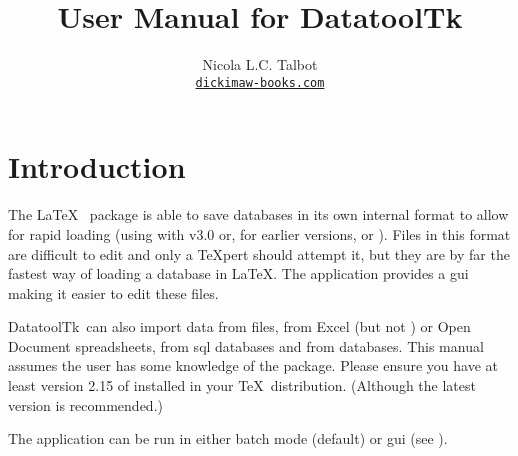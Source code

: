 
\usepackage{fontspec}
\setmainfont{Linux Libertine O}
\usepackage{verbatim}
\usepackage
 [
 ]{texjavahelp}

\hypersetup{colorlinks,linkcolor=blue}

\newcommand{\appname}{DatatoolTk}

\title{User Manual for \appname}
\author{Nicola L.C. Talbot\\\href{https://www.dickimaw-books.com/}{\nolinkurl{dickimaw-books.com}}}


\GlsXtrLoadResources[src={datatooltk},
 \TeXJavaHelpSymbolResourceOptions
]

\GlsXtrLoadResources[src={datatooltk,\langbibsrcs},
 \TeXJavaHelpGlsResourceOptions
]


\maketitle
\frontmatter
\tableofcontents
\listoffigures

\mainmatter
\chapter{Introduction}
\label{sec:introduction}

The \LaTeX\  package is able to save databases in its
own internal format to allow for rapid loading (using
 with
 v3.0 or, for earlier versions,
 or
).  Files in this
 format are difficult to edit and only a \TeX pert should
attempt it, but they are by far the fastest way of loading a
 \gls{database} in \LaTeX. The 
application provides a \gls{gui} making it easier to edit these
files. 

\appname\ can also import data from  files, from
Excel  (but not )
or Open Document  spreadsheets, from 
\gls{sql} databases and from  databases.
This manual assumes the user has some knowledge of the
 package. Please ensure you have at least version
2.15 of  installed in your \TeX\ distribution.
(Although the latest version is recommended.)

The  application can be run in either 
batch mode (default) or \gls{gui} (see ).


